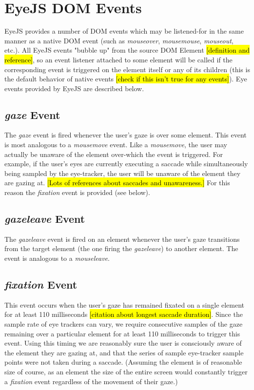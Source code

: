 \documentclass{sigchi}
\begin{document}
\section{EyeJS DOM Events}
EyeJS provides a number of DOM events which may be listened-for in
the same manner as a native DOM event (such as \textit{mouseover}, \textit{mousemouse}, \textit{mouseout}, etc.). All EyeJS events
"bubble up" from the source DOM Element \hl{[definition and reference]},
so an event listener attached to some element will be called if the
corresponding event is triggered on the element itself or any of its
children (this is the default behavior of native events \hl{[check
if this isn't true for any events]}). Eye events provided by EyeJS
are described below.

\subsection{\textbf{\textit{gaze}} Event}
The \textit{gaze} event is fired whenever the user's gaze is over some
element. This event is most analogous to a \textit{mousemove} event.
Like a \textit{mousemove}, the user may actually be unaware of the
element over-which the event is triggered. For example, if the user's
eyes are currently executing a saccade while simultaneously being
sampled by the eye-tracker, the user will be unaware of the element they
are gazing at. \hl{[Lots of references about saccades and unawareness.]}
For this reason the \textit{fixation} event is provided (see below).

\subsection{\textbf{\textit{gazeleave}} Event}
The \textit{gazeleave} event is fired on an element whenever the 
user's gaze transitions from the target element (the one firing the
\textit{gazeleave}) to another element. The event is analogous to a \textit{mouseleave}.

\subsection{\textbf{\textit{fixation}} Event}
This event occurs when the user's gaze has remained fixated on a
single element for at least 110 milliseconds \hl{[citation about 
longest saccade duration]}. Since the sample rate of eye trackers 
can vary, we require consecutive samples of the gaze remaining over a 
particular element for at least 110 milliseconds to trigger this event. 
Using this timing we are reasonably sure the user is consciously aware 
of the element they are gazing at, and that the series of sample
eye-tracker sample points were not taken during a saccade. (Assuming 
the element is of reasonable size of course, as an element the size 
of the entire screen would constantly trigger a \textit{fixation} 
event regardless of the movement of their gaze.)
\end{document}

